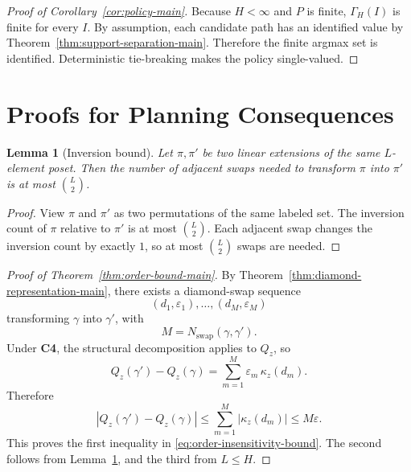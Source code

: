 \documentclass{article}
\newtheorem{lemma}[theorem]{Lemma}
\theoremstyle{definition}
\begin{document}
\begin{proof}[Proof of Corollary~\ref{cor:policy-main}]
Because \(H<\infty\) and \(P\) is finite, \(\Gamma_H(I)\) is finite for every \(I\). By assumption, each candidate path has an identified value by Theorem~\ref{thm:support-separation-main}. Therefore the finite argmax set is identified. Deterministic tie-breaking makes the policy single-valued.
\end{proof}

\section{Proofs for Planning Consequences}
\label{app:planning}

\begin{lemma}[Inversion bound]
\label{lem:inversion-app}
Let \(\pi,\pi'\) be two linear extensions of the same \(L\)-element poset. Then the number of adjacent swaps needed to transform \(\pi\) into \(\pi'\) is at most \(\binom{L}{2}\).
\end{lemma}

\begin{proof}
View \(\pi\) and \(\pi'\) as two permutations of the same labeled set. The inversion count of \(\pi\) relative to \(\pi'\) is at most \(\binom{L}{2}\). Each adjacent swap changes the inversion count by exactly \(1\), so at most \(\binom{L}{2}\) swaps are needed.
\end{proof}

\begin{proof}[Proof of Theorem~\ref{thm:order-bound-main}]
By Theorem~\ref{thm:diamond-representation-main}, there exists a diamond-swap sequence
\[
(d_1,\varepsilon_1),\dots,(d_M,\varepsilon_M)
\]
transforming \(\gamma\) into \(\gamma'\), with
\[
M=N_{\mathrm{swap}}(\gamma,\gamma').
\]
Under \textbf{C4}, the structural decomposition applies to \(Q_z\), so
\[
Q_z(\gamma')-Q_z(\gamma)=\sum_{m=1}^M \varepsilon_m\,\kappa_z(d_m).
\]
Therefore
\[
|Q_z(\gamma')-Q_z(\gamma)|
\le
\sum_{m=1}^M |\kappa_z(d_m)|
\le
M\varepsilon.
\]
This proves the first inequality in \eqref{eq:order-insensitivity-bound}. The second follows from Lemma~\ref{lem:inversion-app}, and the third from \(L\le H\).
\end{proof}
\end{document}
